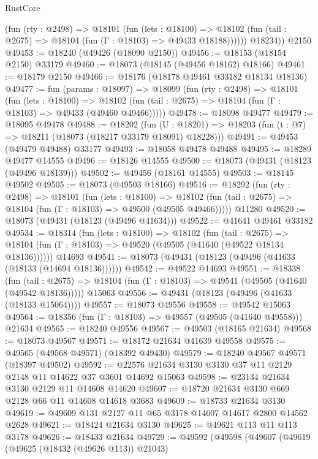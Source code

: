 \begin{lexlean}{RustCore}
\begin{coremodule}
            (fun (rty : @2498) =>
            @18101
              (fun (lets : @18100) =>
              @18102 (fun (tail : @2675) => @18104 (fun (Γ : @18103) => @49433 @18188))))))
        @18234))
    @2150
@49453 := @18240 (@49426 (@18090 @2150))
@49456 := @18153 (@18154 @2150) @33179
@49460 := @18073 (@18145 (@49456 @18162) @18166)
@49461 := @18179 @2150
@49466 := @18176 (@18178 @49461 @33182 @18134 @18136)
@49477 := fun (params : @18097) =>
  @18099
    (fun (rty : @2498) =>
    @18101
      (fun (lets : @18100) =>
      @18102 (fun (tail : @2675) => @18104 (fun (Γ : @18103) => @49433 (@49460 @49466)))))
@49478 := @18098 @49477
@49479 := @18095 @49478
@49488 := @18202
    (fun (U : @18201) => @18203 (fun (t : @7) => @18211 (@18073 (@18217 @33179 @18091) @18228)))
@49491 := @49453 (@49479 @49488) @33177
@49493 := @18058 @49478 @49488
@49495 := @18289 @49477 @14555
@49496 := @18126 @14555
@49500 := @18073 (@49431 (@18123 (@49496 @18139)))
@49502 := @49456 (@18161 @14555)
@49503 := @18145 @49502
@49505 := @18073 (@49503 @18166)
@49516 := @18292
    (fun (rty : @2498) =>
    @18101
      (fun (lets : @18100) =>
      @18102 (fun (tail : @2675) => @18104 (fun (Γ : @18103) => @49500 (@49505 @49466)))))
    @11280
@49520 := @18073 (@49431 (@18123 (@49496 @41634)))
@49522 := @41641 @49461 @33182
@49534 := @18314
    (fun (lets : @18100) =>
    @18102
      (fun (tail : @2675) =>
      @18104 (fun (Γ : @18103) => @49520 (@49505 (@41640 (@49522 @18134 @18136))))))
    @14693
@49541 := @18073 (@49431 (@18123 (@49496 (@41633 (@18133 (@14694 @18136))))))
@49542 := @49522 @14693
@49551 := @18338
    (fun (tail : @2675) => @18104 (fun (Γ : @18103) => @49541 (@49505 (@41640 (@49542 @18136)))))
    @15063
@49556 := @49431 (@18123 (@49496 (@41633 (@18133 @15064))))
@49557 := @18073 @49556
@49558 := @49542 @15063
@49564 := @18356 (fun (Γ : @18103) => @49557 (@49505 (@41640 @49558))) @21634
@49565 := @18240 @49556
@49567 := @49503 (@18165 @21634)
@49568 := @18073 @49567
@49571 := @18172 @21634 @41639 @49558
@49575 := @49565 (@49568 @49571) (@18392 @49430)
@49579 := @18240 @49567 @49571 (@18397 @49502)
@49592 := @22576 @21634 @3130 @3130 @37 @11 @2129 @2148 @11 @14622 @37 @3601 @14692 @15063
@49598 := @23134 @21634 @3130 @2129 @11 @14608 @14620
@49607 := @18720 @21634 @3130 @669 @2128 @66 @11 @14608 @14618 @3683
@49609 := @18733 @21634 @3130
@49619 := @49609 @131 @2127 @11 @65 @3178 @14607 @14617 @2800 @14562 @2628
@49621 := @18424 @21634 @3130
@49625 := @49621 @113 @11 @113 @3178
@49626 := @18433 @21634
@49729 := @49592
    (@49598
      (@49607
        (@49619
          (@49625 (@18432 (@49626 @113)) @21043)

\end{coremodule}
\end{lexlean}

